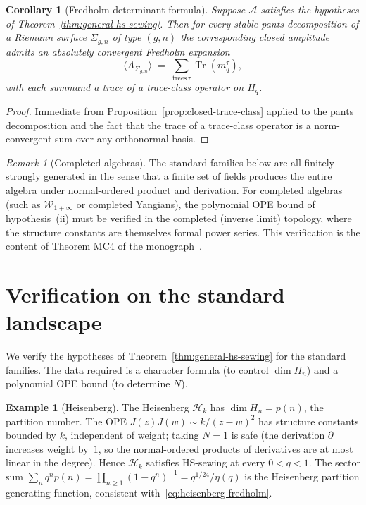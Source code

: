 \documentclass[11pt,reqno]{amsart}
\newtheorem{corollary}[theorem]{Corollary}
\theoremstyle{definition}
\newtheorem{example}[theorem]{Example}
\theoremstyle{remark}
\newtheorem{remark}[theorem]{Remark}
\newcommand{\cA}{\mathcal{A}}
\newcommand{\cH}{\mathcal{H}}
\newcommand{\cW}{\mathcal{W}}
\numberwithin{equation}{section}
\begin{document}
\begin{corollary}[Fredholm determinant formula]
\label{cor:fredholm-formula}
Suppose $\cA$ satisfies the hypotheses of
Theorem~\ref{thm:general-hs-sewing}. Then for every stable
pants decomposition of a Riemann surface $\Sigma_{g,n}$ of type
$(g,n)$ the corresponding closed amplitude admits an absolutely
convergent Fredholm expansion
\[
\langle A_{\Sigma_{g,n}}\rangle
\;=\;
\sum_{\mathrm{trees}\,\tau}
\operatorname{Tr}(m_q^{\tau}),
\]
with each summand a trace of a trace-class operator on $H_q$.
\end{corollary}

\begin{proof}
Immediate from Proposition~\ref{prop:closed-trace-class} applied
to the pants decomposition and the fact that the trace of a
trace-class operator is a norm-convergent sum over any
orthonormal basis.
\end{proof}

\begin{remark}[Completed algebras]\label{rem:completed}
The standard families below are all finitely strongly generated
in the sense that a finite set of fields produces the entire
algebra under normal-ordered product and derivation. For
completed algebras (such as $\cW_{1+\infty}$ or completed
Yangians), the polynomial OPE bound of
hypothesis~(ii) must be verified in the completed (inverse
limit) topology, where the structure constants are themselves
formal power series. This verification is the content of
Theorem MC4 of the monograph~\cite{LorgatVolI}.
\end{remark}


\section{Verification on the standard landscape}\label{sec:examples}

We verify the hypotheses of
Theorem~\ref{thm:general-hs-sewing} for the standard families.
The data required is a character formula (to control $\dim H_n$)
and a polynomial OPE bound (to determine $N$).

\begin{example}[Heisenberg]\label{ex:heisenberg}
The Heisenberg $\cH_k$ has $\dim H_n = p(n)$, the partition
number. The OPE
$J(z)J(w) \sim k/(z-w)^2$ has structure constants bounded by
$k$, independent of weight; taking $N = 1$ is safe (the
derivation $\partial$ increases weight by~$1$, so the
normal-ordered products of derivatives are at most linear in
the degree). Hence $\cH_k$ satisfies HS-sewing at every
$0 < q < 1$. The sector sum
$\sum_n q^n p(n) = \prod_{n \geq 1}(1-q^n)^{-1} = q^{1/24}/\eta(q)$
is the Heisenberg partition generating function,
consistent with~\eqref{eq:heisenberg-fredholm}.
\end{example}
\end{document}
